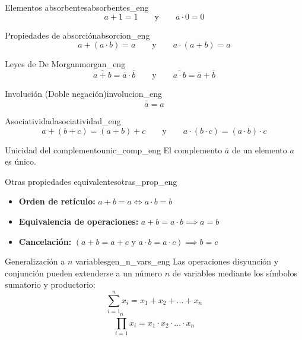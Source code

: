 \documentclass[12pt,a4paper]{article}
\begin{document}
\setcounter{tcb@cnt@teorema}{2}
\begin{teorema}{Elementos absorbentes}{absorbentes_eng}
\[ a + 1 = 1 \qquad \text{y} \qquad a \cdot 0 = 0 \]
\end{teorema}

\setcounter{tcb@cnt@teorema}{5}
\begin{teorema}{Propiedades de absorción}{absorcion_eng}
\[ a + (a \cdot b) = a \qquad \text{y} \qquad a \cdot (a + b) = a \]
\end{teorema}

\setcounter{tcb@cnt@teorema}{11}
\begin{teorema}{Leyes de De Morgan}{morgan_eng}
\[ \overline{a + b} = \overline{a} \cdot \overline{b} \qquad \text{y} \qquad \overline{a \cdot b} = \overline{a} + \overline{b} \]
\end{teorema}

\setcounter{tcb@cnt@teorema}{10}
\begin{teorema}{Involución (Doble negación)}{involucion_eng}
\[ \overline{\overline{a}} = a \]
\end{teorema}

\setcounter{tcb@cnt@teorema}{12}
\begin{teorema}{Asociatividad}{asociatividad_eng}
\[ a + (b + c) = (a + b) + c \qquad \text{y} \qquad a \cdot (b \cdot c) = (a \cdot b) \cdot c \]
\end{teorema}

\setcounter{tcb@cnt@teorema}{9}
\begin{teorema}{Unicidad del complemento}{unic_comp_eng}
El complemento $\overline{a}$ de un elemento $a$ es único.
\end{teorema}

\setcounter{tcb@cnt@teorema}{6}
\begin{teorema}{Otras propiedades equivalentes}{otras_prop_eng}
\begin{itemize}
    \item \textbf{Orden de retículo:} $a + b = a \iff a \cdot b = b$
    \item \textbf{Equivalencia de operaciones:} $a + b = a \cdot b \implies a = b$
    \item \textbf{Cancelación:} $(a + b = a + c \text{ y } a \cdot b = a \cdot c) \implies b = c$
\end{itemize}
\end{teorema}

\setcounter{tcb@cnt@definicion}{0}
\begin{definicion}{Generalización a $n$ variables}{gen_n_vars_eng}
Las operaciones disyunción y conjunción pueden extenderse a un número $n$ de variables mediante los símbolos sumatorio y productorio:
\[ \sum_{i=1}^{n} x_i = x_1 + x_2 + \dots + x_n \]
\[ \prod_{i=1}^{n} x_i = x_1 \cdot x_2 \cdot \dots \cdot x_n \]
\end{definicion}
\end{document}
